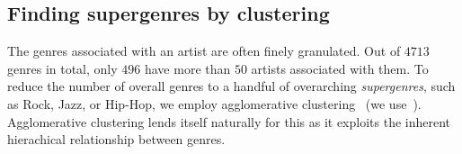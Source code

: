 \documentclass{article}
\begin{document}




\subsection{Finding supergenres by clustering}
\label{sec:genre_clustering}
The genres associated with an artist are often finely granulated. Out of $4713$ genres in total, only $496$ have more than $50$ artists associated with them. To reduce the number of overall genres to a handful of overarching \emph{supergenres}, such as Rock, Jazz, or Hip-Hop, we employ agglomerative clustering~\cite{ward1963hierarchical} (we use~\cite{scikit-learn}). Agglomerative clustering lends itself naturally for this as it exploits the inherent hierachical relationship between genres.
\end{document}
